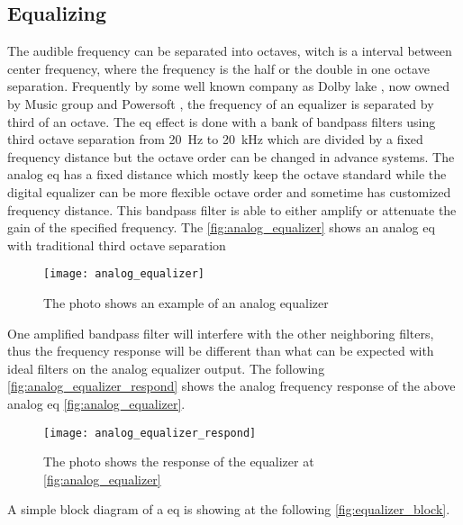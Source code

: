 \subsection{Equalizing}
The audible frequency can be separated into octaves, witch is a interval between center frequency, where the frequency is the half or the double in one octave separation. Frequently by some well known company as Dolby lake \citep{lab_gruppen_eq}, now owned by Music group and Powersoft \citep{powersoft_eq}, the frequency of an equalizer is separated by third of an octave. 
The \gls{eq} effect is done with a bank of bandpass filters using third octave separation from \SI{20}{\hertz} to \SI{20}{\kilo\hertz} which are divided by a fixed frequency distance but the octave order can be changed in advance systems. The analog \gls{eq} has a fixed distance which mostly keep the octave standard while the digital equalizer can be more flexible octave order and sometime has customized frequency distance. This bandpass filter is able to either amplify or attenuate the gain of the specified frequency. The \autoref{fig:analog_equalizer} shows an analog \gls{eq} with traditional third octave separation \citep{nordic}

\begin{figure} [htbp]
 \centering
  \texttt{[image: analog\_equalizer]}
  \caption{The photo shows an example of an analog equalizer}
  \label{fig:analog_equalizer}
\end{figure}

One amplified bandpass filter will interfere with the other neighboring filters, thus the frequency response will be different than what can be expected with ideal filters on the analog equalizer output. The following \autoref{fig:analog_equalizer_respond} shows the analog frequency response of the above analog \gls{eq} \autoref{fig:analog_equalizer}.

\begin{figure} [htbp]
 \centering
  \texttt{[image: analog\_equalizer\_respond]}
  \caption{The photo shows the response of the equalizer at \autoref{fig:analog_equalizer} \citep{nordic}}
  \label{fig:analog_equalizer_respond}
\end{figure}

A simple block diagram of a \gls{eq}  is showing at the following \autoref{fig:equalizer_block}.

